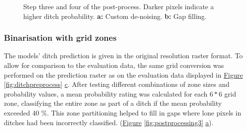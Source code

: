 \documentclass[11pt, review]{elsarticle} %
\providecommand{\DIFaddendFL}{} %
\begin{document}
\begin{figure} [!htb]
{        }
    \DIFaddendFL \caption{Step three and four of the post-process. Darker pixels indicate a higher ditch probability. \textbf{a: }Custom de-noising. \textbf{b: }Gap filling.}
    \label{fig:postprocessing2}
\end{figure}

\subsubsection{Binarisation with grid zones}
The models' ditch prediction is given in the original resolution raster format. To allow for comparison to the evaluation data, the same grid conversion was performed on the prediction raster as on the evaluation data displayed in \hyperref[fig:ditchpreprocess]{Figure} \ref{fig:ditchpreprocess} \hyperref[fig:ditchpreprocess]{c}. After testing different combinations of zone sizes and probability values, a mean probability rating was calculated for each $6*6$ grid zone, classifying the entire zone as part of a ditch if the mean probability exceeded 40 \%. This zone partitioning helped to fill in gaps where lone pixels in ditches had been incorrectly classified. (\hyperref[fig:postprocessing3]{Figure} \ref{fig:postprocessing3} \hyperref[fig:postprocessing3]{a}).
\end{document}
